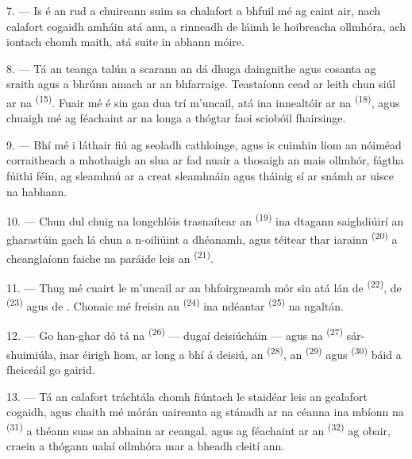\VUsaut{3.0mm}
\VUsaut{3.0mm}

7. --- Is é an rud a chuireann suim sa chalafort a bhfuil mé ag caint air, nach
calafort cogaidh amháin atá ann, a rinneadh de láimh le hoibreacha ollmhóra, ach
 iontach chomh maith, atá suite in 
abhann móire.

8. --- Tá an teanga talún a scarann an dá dhuga daingnithe agus cosanta ag sraith
 agus  a bhrúnn amach ar an bhfarraige. Teastaíonn
cead ar leith chun siúl ar na  \textsuperscript{(15)}. Fuair mé é sin
gan dua trí m'uncail, atá ina innealtóir ar na 
\textsuperscript{(18)}, agus chuaigh mé ag féachaint ar na longa a thógtar faoi
sciobóil fhairsinge.

9. --- Bhí mé i láthair fiú ag seoladh cathloinge, agus is cuimhin liom an nóiméad
corraitheach a mhothaigh an slua ar fad nuair a thosaigh an mais ollmhór, fágtha
fúithi féin, ag sleamhnú ar a creat sleamhnáin agus tháinig sí ar snámh ar uisce na
habhann.

10. --- Chun dul chuig na longchlóis trasnaítear an 
\textsuperscript{(19)} ina dtagann saighdiúirí an gharastúin gach lá chun a n-oiliúint
a dhéanamh, agus téitear thar  iarainn
\textsuperscript{(20)} a cheanglaíonn faiche na paráide leis an 
\textsuperscript{(21)}.

\VUsaut{3.0mm}
\VUsaut{3.0mm}

11. --- Thug mé cuairt le m'uncail ar an bhfoirgneamh mór sin atá lán de
 \textsuperscript{(22)}, de 
\textsuperscript{(23)} agus de . Chonaic mé freisin an
 \textsuperscript{(24)} ina ndéantar 
\textsuperscript{(25)} na ngaltán.

12. --- Go han-ghar dó tá na  \textsuperscript{(26)} --- dugaí
deisiúcháin --- agus na  \textsuperscript{(27)}
sár-shuimiúla, inar éirigh liom, ar long a bhí á deisiú, an 
\textsuperscript{(28)}, an  \textsuperscript{(29)} agus 
\textsuperscript{(30)} báid a fheiceáil go gairid.

13. --- Tá an calafort tráchtála chomh fiúntach le staidéar leis an gcalafort
cogaidh, agus chaith mé mórán uaireanta ag stánadh ar na céanna ina mbíonn na
 \textsuperscript{(31)} a théann suas an abhainn ar ceangal,
agus ag féachaint ar an  \textsuperscript{(32)} ag obair,
craein a thógann ualaí ollmhóra mar a bheadh cleití ann.


